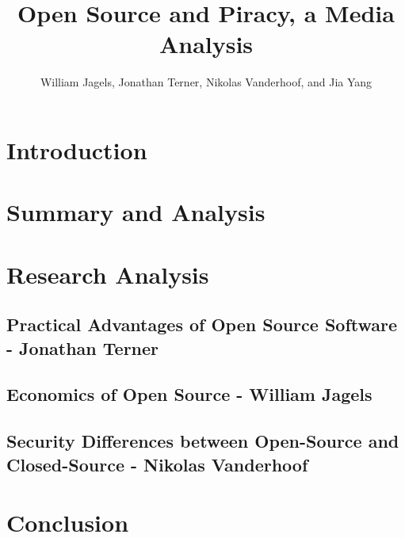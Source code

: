 \documentclass[12pt,babel,english,man,natbib,apacite]{apa6}
\title{Open Source and Piracy, a Media Analysis}
\author{William Jagels, Jonathan Terner, Nikolas Vanderhoof, and Jia Yang}
\affiliation{Binghamton University}
\begin{document}
\maketitle
\section{Introduction}

\section{Summary and Analysis}

\section{Research Analysis}
\subsection{Practical Advantages of Open Source Software - Jonathan Terner}

\subsection{Economics of Open Source - William Jagels}

\subsection{Security Differences between Open-Source and Closed-Source - Nikolas
            Vanderhoof}

\section{Conclusion}



\end{document}
